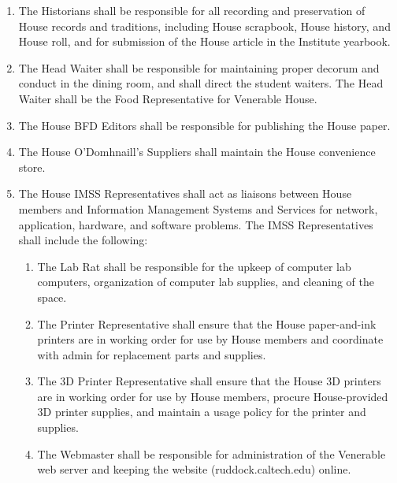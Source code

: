 \documentclass[10pt]{article} %
\begin{document}
\begin{enumerate}
\item The Historians shall be responsible for all recording and preservation of House records and traditions, including House scrapbook, House history, and House roll, and for submission of the House article in the Institute yearbook.
\item The Head Waiter shall be responsible for maintaining proper decorum and conduct in the dining room, and shall direct the student waiters. The Head Waiter shall be the Food Representative for Venerable House.
\item The House BFD Editors shall be responsible for publishing the House paper.
\item The House O’Domhnaill’s Suppliers shall maintain the House convenience store.
\item The House IMSS Representatives shall act as liaisons between House members and Information Management Systems and Services for network, application, hardware, and software problems. The IMSS Representatives shall include the following:
\begin{enumerate}
	\item The Lab Rat shall be responsible for the upkeep of computer lab computers, organization of computer lab supplies, and cleaning of the space.
	\item The Printer Representative shall ensure that the House paper-and-ink printers are in working order for use by House members and coordinate with admin for replacement parts and supplies.
	\item The 3D Printer Representative shall ensure that the House 3D printers are in working order for use by House members, procure House-provided 3D printer supplies, and maintain a usage policy for the printer and supplies.
	\item The Webmaster shall be responsible for administration of the Venerable web server and keeping the website (ruddock.caltech.edu) online.
\end{enumerate}
\end{enumerate}
\end{document}
